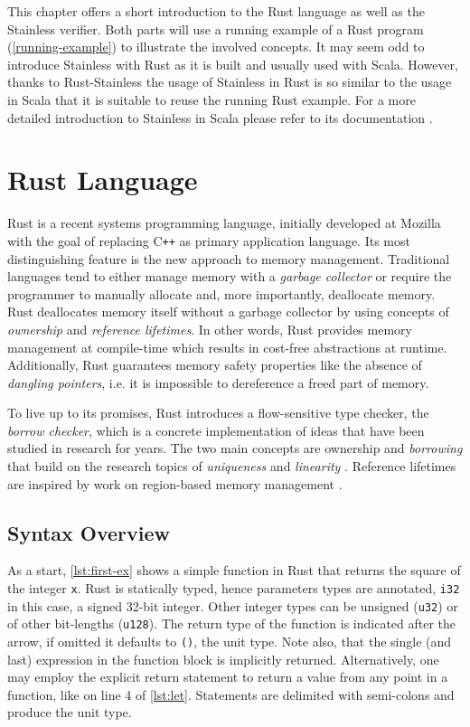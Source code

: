 This chapter offers a short introduction to the Rust language as well as the
Stainless verifier. Both parts will use a running example of a Rust program
(\autoref{running-example}) to illustrate the involved concepts. It may seem odd
to introduce Stainless with Rust  as it is built and usually used with Scala.
However, thanks to Rust-Stainless the  usage of Stainless in Rust is so similar
to the usage in Scala that it is suitable  to reuse the running Rust example.
For a more detailed introduction to Stainless in Scala please refer to its
documentation \cite{stainless-doc}.

\section{Rust Language}

Rust \cite{rust2, rust1} is a recent systems programming language, initially
developed at Mozilla with the goal of replacing C\texttt{++} as primary
application language. Its most distinguishing feature is the new approach to
memory management. Traditional languages tend to either manage memory with a
\emph{garbage collector} or require the programmer to manually allocate and,
more importantly, deallocate memory. Rust deallocates memory itself without a
garbage collector by using concepts of \emph{ownership} and \emph{reference
lifetimes}. In other words, Rust provides memory management at compile-time
which results in cost-free abstractions at runtime. Additionally, Rust
guarantees memory safety properties like  the absence of \emph{dangling
pointers}, i.e. it is impossible to dereference a freed part of memory.

To live up to its promises, Rust introduces a flow-sensitive type checker, the
\emph{borrow checker}, which is a concrete implementation of ideas that have
been studied in research for years. The two main concepts are ownership
\cite{ownership-types} and \emph{borrowing} that build on the research topics of
\emph{uniqueness} \cite{alias-burying} and \emph{linearity}
\cite{Wadler90lineartypes, once-upon-a-type}. Reference lifetimes are inspired
by work on region-based memory management \cite{cyclone-region}.


\subsection{Syntax Overview}

As a start, \autoref{lst:first-ex} shows a simple function in Rust that returns
the square of the integer \lstinline!x!. Rust is statically typed, hence
parameters types are annotated, \lstinline!i32! in this case, a signed 32-bit
integer. Other integer types can be unsigned (\lstinline!u32!) or of other
bit-lengths (\lstinline!u128!). The return type of the function is indicated
after the arrow, if omitted it defaults to \lstinline!()!, the unit type. Note
also, that the single (and last) expression in the function block is implicitly
returned. Alternatively, one may employ the explicit return statement to return
a value from any point in a function, like on line 4 of \autoref{lst:let}.
Statements are delimited with semi-colons and produce the unit type.

